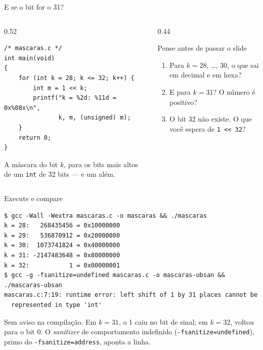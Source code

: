 \documentclass[aspectratio=169]{beamer}
\begin{document}
\begin{frame}[fragile]{E se o bit for o 31?}
  \begin{columns}[c]
    \begin{column}{0.52\textwidth}
\begin{lstlisting}[style=codC]
/* mascaras.c */
int main(void)
{
    for (int k = 28; k <= 32; k++) {
        int m = 1 << k;
        printf("k = %2d: %11d = 0x%08x\n",
               k, m, (unsigned) m);
    }
    return 0;
}
\end{lstlisting}
      \small A máscara do bit $k$, para os bits mais altos de um
      \texttt{int} de 32 bits --- e um além.
    \end{column}
    \begin{column}{0.44\textwidth}
      \begin{block}{Pense antes de passar o slide}
        \small
        \begin{enumerate}
          \item Para $k = 28$, \ldots, $30$, o que sai em decimal e em hexa?
          \item E para $k = 31$? O número é positivo?
          \item O bit 32 não existe. O que você espera de \texttt{1 <{}< 32}?
        \end{enumerate}
      \end{block}
    \end{column}
  \end{columns}
\end{frame}

\begin{frame}[fragile]{Execute e compare}
\begin{lstlisting}[style=shellStyle]
$ gcc -Wall -Wextra mascaras.c -o mascaras && ./mascaras
k = 28:   268435456 = 0x10000000
k = 29:   536870912 = 0x20000000
k = 30:  1073741824 = 0x40000000
k = 31: -2147483648 = 0x80000000
k = 32:           1 = 0x00000001
$ gcc -g -fsanitize=undefined mascaras.c -o mascaras-ubsan && ./mascaras-ubsan
mascaras.c:7:19: runtime error: left shift of 1 by 31 places cannot be
  represented in type 'int'
\end{lstlisting}
  \small Sem aviso na compilação. Em $k = 31$, o 1 caiu no bit de sinal; em
  $k = 32$, voltou para o bit 0. O \emph{sanitizer} de comportamento
  indefinido (\texttt{-fsanitize=undefined}), primo do
  \texttt{-fsanitize=address}, aponta a linha.
\end{frame}
\end{document}
